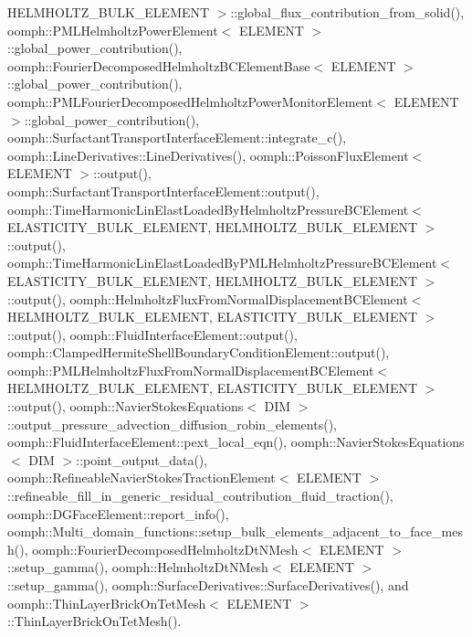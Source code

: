 H\+E\+L\+M\+H\+O\+L\+T\+Z\+\_\+\+B\+U\+L\+K\+\_\+\+E\+L\+E\+M\+E\+N\+T $>$\+::global\+\_\+flux\+\_\+contribution\+\_\+from\+\_\+solid(), oomph\+::\+P\+M\+L\+Helmholtz\+Power\+Element$<$ E\+L\+E\+M\+E\+N\+T $>$\+::global\+\_\+power\+\_\+contribution(), oomph\+::\+Fourier\+Decomposed\+Helmholtz\+B\+C\+Element\+Base$<$ E\+L\+E\+M\+E\+N\+T $>$\+::global\+\_\+power\+\_\+contribution(), oomph\+::\+P\+M\+L\+Fourier\+Decomposed\+Helmholtz\+Power\+Monitor\+Element$<$ E\+L\+E\+M\+E\+N\+T $>$\+::global\+\_\+power\+\_\+contribution(), oomph\+::\+Surfactant\+Transport\+Interface\+Element\+::integrate\+\_\+c(), oomph\+::\+Line\+Derivatives\+::\+Line\+Derivatives(), oomph\+::\+Poisson\+Flux\+Element$<$ E\+L\+E\+M\+E\+N\+T $>$\+::output(), oomph\+::\+Surfactant\+Transport\+Interface\+Element\+::output(), oomph\+::\+Time\+Harmonic\+Lin\+Elast\+Loaded\+By\+Helmholtz\+Pressure\+B\+C\+Element$<$ E\+L\+A\+S\+T\+I\+C\+I\+T\+Y\+\_\+\+B\+U\+L\+K\+\_\+\+E\+L\+E\+M\+E\+N\+T, H\+E\+L\+M\+H\+O\+L\+T\+Z\+\_\+\+B\+U\+L\+K\+\_\+\+E\+L\+E\+M\+E\+N\+T $>$\+::output(), oomph\+::\+Time\+Harmonic\+Lin\+Elast\+Loaded\+By\+P\+M\+L\+Helmholtz\+Pressure\+B\+C\+Element$<$ E\+L\+A\+S\+T\+I\+C\+I\+T\+Y\+\_\+\+B\+U\+L\+K\+\_\+\+E\+L\+E\+M\+E\+N\+T, H\+E\+L\+M\+H\+O\+L\+T\+Z\+\_\+\+B\+U\+L\+K\+\_\+\+E\+L\+E\+M\+E\+N\+T $>$\+::output(), oomph\+::\+Helmholtz\+Flux\+From\+Normal\+Displacement\+B\+C\+Element$<$ H\+E\+L\+M\+H\+O\+L\+T\+Z\+\_\+\+B\+U\+L\+K\+\_\+\+E\+L\+E\+M\+E\+N\+T, E\+L\+A\+S\+T\+I\+C\+I\+T\+Y\+\_\+\+B\+U\+L\+K\+\_\+\+E\+L\+E\+M\+E\+N\+T $>$\+::output(), oomph\+::\+Fluid\+Interface\+Element\+::output(), oomph\+::\+Clamped\+Hermite\+Shell\+Boundary\+Condition\+Element\+::output(), oomph\+::\+P\+M\+L\+Helmholtz\+Flux\+From\+Normal\+Displacement\+B\+C\+Element$<$ H\+E\+L\+M\+H\+O\+L\+T\+Z\+\_\+\+B\+U\+L\+K\+\_\+\+E\+L\+E\+M\+E\+N\+T, E\+L\+A\+S\+T\+I\+C\+I\+T\+Y\+\_\+\+B\+U\+L\+K\+\_\+\+E\+L\+E\+M\+E\+N\+T $>$\+::output(), oomph\+::\+Navier\+Stokes\+Equations$<$ D\+I\+M $>$\+::output\+\_\+pressure\+\_\+advection\+\_\+diffusion\+\_\+robin\+\_\+elements(), oomph\+::\+Fluid\+Interface\+Element\+::pext\+\_\+local\+\_\+eqn(), oomph\+::\+Navier\+Stokes\+Equations$<$ D\+I\+M $>$\+::point\+\_\+output\+\_\+data(), oomph\+::\+Refineable\+Navier\+Stokes\+Traction\+Element$<$ E\+L\+E\+M\+E\+N\+T $>$\+::refineable\+\_\+fill\+\_\+in\+\_\+generic\+\_\+residual\+\_\+contribution\+\_\+fluid\+\_\+traction(), oomph\+::\+D\+G\+Face\+Element\+::report\+\_\+info(), oomph\+::\+Multi\+\_\+domain\+\_\+functions\+::setup\+\_\+bulk\+\_\+elements\+\_\+adjacent\+\_\+to\+\_\+face\+\_\+mesh(), oomph\+::\+Fourier\+Decomposed\+Helmholtz\+Dt\+N\+Mesh$<$ E\+L\+E\+M\+E\+N\+T $>$\+::setup\+\_\+gamma(), oomph\+::\+Helmholtz\+Dt\+N\+Mesh$<$ E\+L\+E\+M\+E\+N\+T $>$\+::setup\+\_\+gamma(), oomph\+::\+Surface\+Derivatives\+::\+Surface\+Derivatives(), and oomph\+::\+Thin\+Layer\+Brick\+On\+Tet\+Mesh$<$ E\+L\+E\+M\+E\+N\+T $>$\+::\+Thin\+Layer\+Brick\+On\+Tet\+Mesh().

